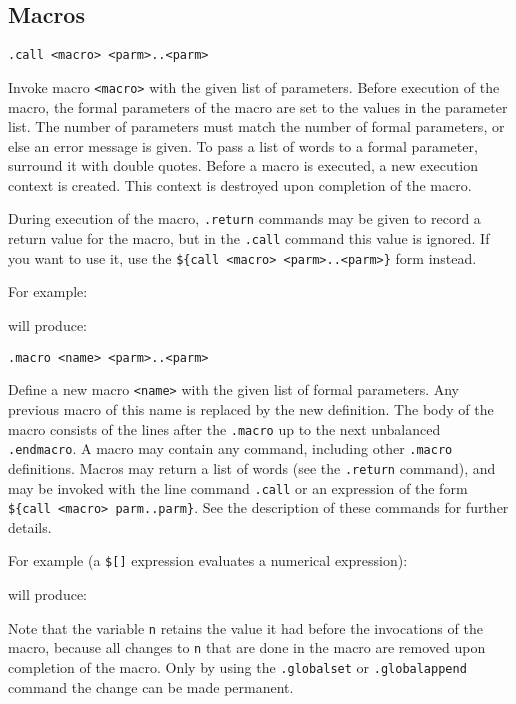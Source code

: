 \subsection{Macros}
\begin{verbatim}
.call <macro> <parm>..<parm>
\end{verbatim}
\begin{desc}
Invoke macro \verb+<macro>+ with the given list of parameters. Before
execution of the macro, the formal parameters of the macro are set to
the values in the parameter list. The number of parameters must match the
number of formal parameters, or else an error message is given. To pass
a list of words to a formal parameter, surround it with double quotes.
Before a macro is executed, a new execution context is created. This
context is destroyed upon completion of the macro.

During execution of the macro, \verb+.return+ commands may be given to
record a return value for the macro, but in the \verb+.call+ command this
value is ignored.  If you want to use it, use the
\verb+${call <macro> <parm>..<parm>}+ form instead.

For example:
\begin{showfile}

\end{showfile}
will produce:
\begin{showfile}

\end{showfile}
\end{desc}
\begin{verbatim}
.macro <name> <parm>..<parm>
\end{verbatim}
\begin{desc}
Define a new macro \verb+<name>+ with the given list of formal parameters.
Any previous macro of this name is replaced by the new definition.
The body of the macro consists of the lines after the
\verb+.macro+ up to the next unbalanced \verb+.endmacro+.
A macro may contain any {\Tm} command, including other \verb+.macro+
definitions.
Macros may return a list of words (see the \verb+.return+ command),
and may be invoked with the line command \verb+.call+ or an expression
of the form \verb+${call <macro> parm..parm}+.
See the description of these commands for further details.

For example (a \verb'$[]' expression evaluates a numerical expression):
\begin{showfile}

\end{showfile}
will produce:
\begin{showfile}

\end{showfile}
Note that the variable \verb'n' retains the value it had before the
invocations of the macro, because all changes to \verb'n' that are
done in the macro are removed upon completion of the macro.
Only by using the \verb'.globalset' or \verb'.globalappend' command
the change can be made permanent.
\end{desc}
